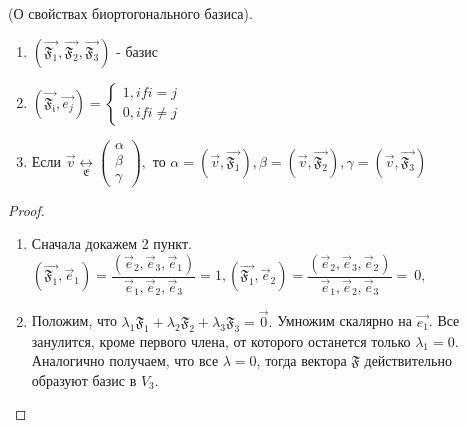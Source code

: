 \begin{theorem}
	(О свойствах биортогонального базиса). 
	\begin{enumerate}
		\item \((\vec{\mathfrak{F_1}},\vec{\mathfrak{F_2}},\vec{\mathfrak{F_3}})\) - базис
		\item \((\vec{\mathfrak{F_i}}, \vec{e_j}) = \left\{
		\begin{gathered}
			1, if i = j \\
			0, if i \ne j
		\end{gathered}
		\right.\)
		\item Если \(\vec v\underset{\mathfrak{E}}{\longleftrightarrow}\begin{pmatrix}
			\alpha \\ \beta \\ \gamma
		\end{pmatrix}, \) то \(\alpha = (\vec v, \vec{\mathfrak{F_1}}),
		\beta = (\vec v, \vec{\mathfrak{F_2}}),
		\gamma = (\vec v, \vec{\mathfrak{F_3}})\)
	\end{enumerate}
\end{theorem}
\begin{proof}
	\begin{enumerate}
		\item Сначала докажем 2 пункт. \((\vec{\mathfrak{F_1}}, \vec e_1) = \dfrac{(\vec e_2, \vec e_3, \vec e_1)}{\vec e_1, \vec e_2, \vec e_3} = 1,
		(\vec{\mathfrak{F_1}}, \vec e_2) = \dfrac{(\vec e_2, \vec e_3, \vec e_2)}{\vec e_1, \vec e_2, \vec e_3} =~0,\)
		\item Положим, что \(\lambda_1\mathfrak{F_1}+\lambda_2\mathfrak{F_2}+\lambda_3\mathfrak{F_3}=\vec 0.\) Умножим скалярно на $\vec{e_1}$. Все занулится, кроме первого члена, от которого останется только \(\lambda_1 = 0\). Аналогично получаем, что все $\lambda = 0$, тогда вектора $\mathfrak{F}$ действительно образуют базис в \(V_3\). 
	\end{enumerate}
\end{proof}